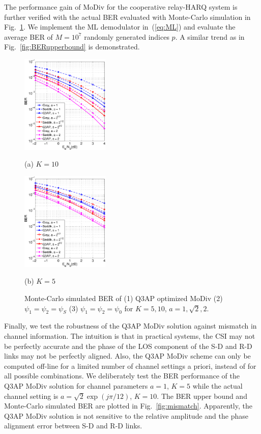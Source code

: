 \documentclass[journal]{IEEEtran}
\begin{document}
The performance gain of MoDiv for the cooperative relay-HARQ
system is further verified with the actual BER evaluated with Monte-Carlo
simulation in Fig.~\ref{fig:montecarlo}. We implement the ML demodulator
in~(\ref{eq:ML}) and evaluate the average BER of $M=10^7$ randomly generated
indices $p$. A similar trend as in Fig.~\ref{fig:BERupperbound} is demonstrated.

\begin{figure}[!t]
    \begin{minipage}[b]{0.49\linewidth}
      \centering
      \centerline{\includegraphics[width=4.2cm]{./figs/MC_10.eps}}
      \centerline{(a) $ K = 10$}\medskip
    \end{minipage}
    \hfill
    \begin{minipage}[b]{0.49\linewidth}
      \centering
      \centerline{\includegraphics[width=4.2cm]{./figs/MC_5.eps}}
      \centerline{(b) $K=5$}\medskip
    \end{minipage}
    \caption{Monte-Carlo simulated BER of (1) Q3AP optimized MoDiv
    (2) $\psi_1 = \psi_2 = \psi_S$ (3) $\psi_1 = \psi_2 = \psi_0$ for $K = 5,
    10$, $a = 1, \sqrt{2}, 2$.}
    \label{fig:montecarlo}
\end{figure}

Finally, we test the robustness of the Q3AP MoDiv solution against mismatch in
channel information. The intuition is that in practical systems, the CSI may not
be perfectly accurate and the phase of the LOS component of the S-D and R-D
links may not be perfectly aligned. Also, the Q3AP MoDiv scheme can only be
computed off-line for a limited number of channel settings a priori, instead of
for all possible combinations. We deliberately test the BER performance of the
Q3AP MoDiv solution for channel parameters $a=1$, $K=5$ while the actual channel
setting is $a = \sqrt{2}\exp(j\pi/12)$, $K = 10$. The BER upper bound and
Monte-Carlo simulated BER are plotted in Fig.~\ref{fig:mismatch}. Apparently,
the Q3AP MoDiv solution is not sensitive to the relative amplitude and the phase
alignment error between S-D and R-D links.
\end{document}
